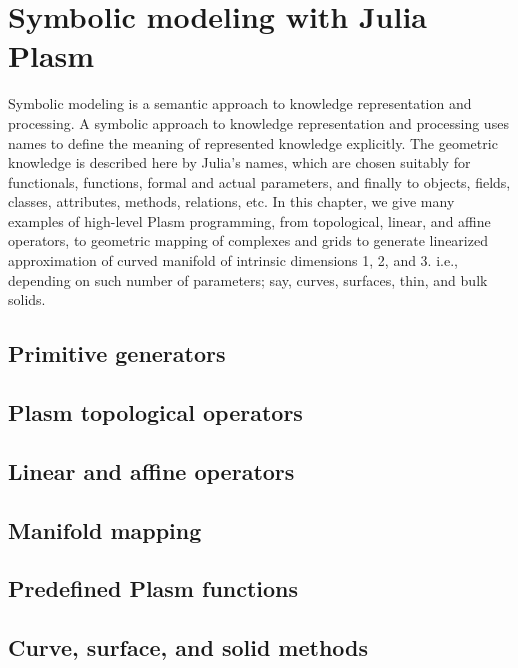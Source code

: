 
\chapter{Symbolic modeling with Julia Plasm}
\label{chapt:5}

Symbolic modeling is a semantic approach to knowledge representation and processing. A  symbolic approach to knowledge representation and processing uses names to define the meaning of represented knowledge explicitly. The geometric knowledge is described here by Julia's names, which are chosen suitably for functionals, functions, formal and actual parameters, and finally to objects, fields, classes, attributes, methods, relations, etc. In this chapter, we give many examples of high-level Plasm programming, from topological, linear, and affine operators, to geometric mapping of complexes and grids to generate linearized approximation of curved manifold of intrinsic dimensions 1, 2, and 3. i.e., depending on such number of parameters; say, curves, surfaces, thin, and bulk solids.

\section{ Primitive generators}\label{sect:5-1}


\section{ Plasm topological operators}\label{sect:5-2}


\section{ Linear and affine operators}\label{sect:5-3}


\section{ Manifold mapping}\label{sect:5-4}


\section{ Predefined Plasm functions}\label{sect:5-5}


\section{ Curve, surface, and solid methods}\label{sect:5-6}


